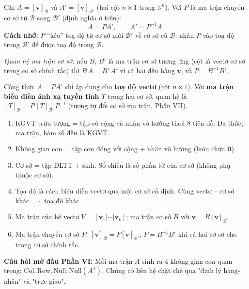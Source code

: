 \documentclass[12pt,a4paper]{article}
\begin{document}
\begin{congthuc}[title={Liên hệ ma trận toạ độ trong hai cơ sở}]
Ghi $A = [\mathbf{v}]_{\mathcal{B}}$ và $A' = [\mathbf{v}]_{\mathcal{B}'}$ (hai cột $n \times 1$ trong $\mathbb{R}^n$). Với $P$ là ma trận chuyển cơ sở từ $\mathcal{B}$ sang $\mathcal{B}'$ (định nghĩa ở trên):
\[
  A = P A',\qquad A' = P^{-1} A.
\]
\textbf{Cách nhớ:} $P$ ``kéo'' toạ độ từ cơ sở mới $\mathcal{B}'$ về cơ sở cũ $\mathcal{B}$: nhân $P$ vào toạ độ trong $\mathcal{B}'$ để được toạ độ trong $\mathcal{B}$.

\emph{Quan hệ ma trận cơ sở:} nếu $B$, $B'$ là ma trận cơ sở tương ứng (cột là vectơ cơ sở trong cơ sở chính tắc) thì $B\,A = B'\,A'$ vì cả hai đều bằng $\mathbf{v}$, và $P = B^{-1}B'$.
\end{congthuc}

\begin{luuy}
Công thức $A = PA'$ chỉ áp dụng cho \textbf{toạ độ vectơ} (cột $n \times 1$). Với \textbf{ma trận biểu diễn ánh xạ tuyến tính} $T$ trong hai cơ sở, quan hệ là $[T]_{\mathcal{B}} = P\,[T]_{\mathcal{B}'}\,P^{-1}$ (tương tự đổi cơ sở ma trận, Phần VII).
\end{luuy}

\begin{tongket}[title={Tổng kết Phần V}]
\begin{enumerate}
  \item KGVT trừu tượng = tập có cộng và nhân vô hướng thoả 8 tiên đề. Đa thức, ma trận, hàm số đều là KGVT.
  \item Không gian con = tập con đóng với cộng + nhân vô hướng (luôn chứa $\mathbf{0}$).
  \item Cơ sở = tập ĐLTT + sinh. Số chiều là số phần tử của cơ sở (không phụ thuộc cơ sở).
  \item Tọa độ là cách biểu diễn vectơ qua một cơ sở cố định. Cùng vectơ -- cơ sở khác $\Rightarrow$ tọa độ khác.
  \item Ma trận của hệ vectơ $V = [\mathbf{v}_1 | \cdots | \mathbf{v}_k]$; ma trận cơ sở $B$ với $\mathbf{v} = B[\mathbf{v}]_{\mathcal{B}}$.
  \item Ma trận chuyển cơ sở $P$: $[\mathbf{v}]_{\mathcal{B}} = P[\mathbf{v}]_{\mathcal{B}'}$, $P = B^{-1}B'$ khi cả hai cơ sở cho trong cơ sở chính tắc.
\end{enumerate}

\textbf{Câu hỏi mở đầu Phần VI:} Mỗi ma trận $A$ sinh ra 4 không gian con quan trọng: $\mathrm{Col}, \mathrm{Row}, \mathrm{Null}, \mathrm{Null}(A^T)$. Chúng có liên hệ chặt chẽ qua "định lý hạng-nhân" và "trực giao".
\end{tongket}
\end{document}
